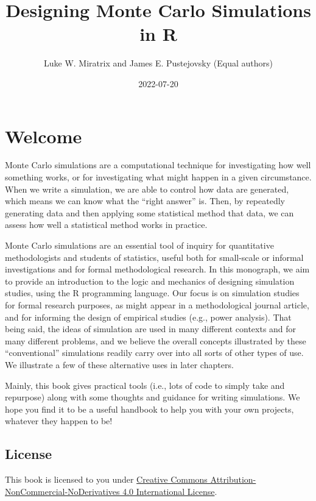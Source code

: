 \documentclass[
]{book}
\title{Designing Monte Carlo Simulations in R}
\author{Luke W. Miratrix and James E. Pustejovsky
(Equal authors)}
\date{2022-07-20}
\begin{document}
\maketitle

{
\setcounter{tocdepth}{1}
\tableofcontents
}
\hypertarget{welcome}{%
\chapter*{Welcome}\label{welcome}}

Monte Carlo simulations are a computational technique for investigating how well something works, or for investigating what might happen in a given circumstance.
When we write a simulation, we are able to control how data are generated, which means we can know what the ``right answer'' is.
Then, by repeatedly generating data and then applying some statistical method that data, we can assess how well a statistical method works in practice.

Monte Carlo simulations are an essential tool of inquiry for quantitative methodologists and students of statistics, useful both for small-scale or informal investigations and for formal methodological research.
In this monograph, we aim to provide an introduction to the logic and mechanics of designing simulation studies, using the R programming language.
Our focus is on simulation studies for formal research purposes, as might appear in a methodological journal article, and for informing the design of empirical studies (e.g., power analysis).
That being said, the ideas of simulation are used in many different contexts and for many different problems, and we believe the overall concepts illustrated by these ``conventional'' simulations readily carry over into all sorts of other types of use.
We illustrate a few of these alternative uses in later chapters.

Mainly, this book gives practical tools (i.e., lots of code to simply take and repurpose) along with some thoughts and guidance for writing simulations.
We hope you find it to be a useful handbook to help you with your own projects, whatever they happen to be!

\hypertarget{license}{%
\section*{License}\label{license}}

This book is licensed to you under \href{http://creativecommons.org/licenses/by-nc-nd/4.0/}{Creative Commons Attribution-NonCommercial-NoDerivatives 4.0 International License}.
\end{document}
